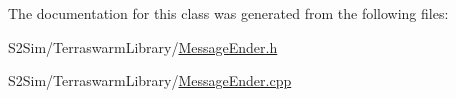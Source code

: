 The documentation for this class was generated from the following files\-:\begin{DoxyCompactItemize}
\item 
S2\-Sim/\-Terraswarm\-Library/\hyperlink{_message_ender_8h}{Message\-Ender.\-h}\item 
S2\-Sim/\-Terraswarm\-Library/\hyperlink{_message_ender_8cpp}{Message\-Ender.\-cpp}\end{DoxyCompactItemize}
